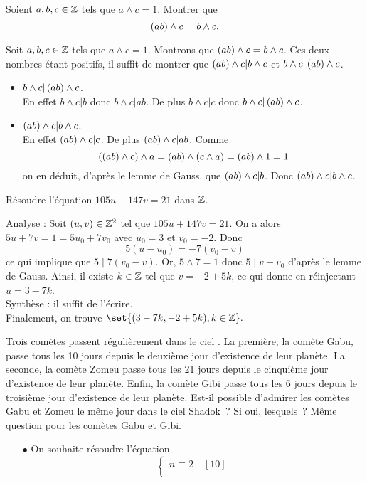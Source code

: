 \documentclass{magnolia}
\begin{document}
\begin{exos}
\exo Soient $a,b,c\in\Z$ tels que $a\wedge c=1$. Montrer que
  \[\left(ab\right)\wedge c=b\wedge c.\]
  \begin{sol}
  Soit $a,b,c\in\Z$ tels que $a\wedge c=1$. Montrons que
  $\p{ab}\wedge c=b\wedge c$. Ces deux nombres étant positifs, il suffit de
  montrer que $\p{ab}\wedge c|b\wedge c$ et $b\wedge c|\p{ab}\wedge c$.
  \begin{itemize}
  \item $b\wedge c|\p{ab}\wedge c$.\\
    En effet $b\wedge c|b$ donc $b\wedge c|ab$. De plus $b\wedge c|c$ donc
    $b\wedge c|\p{ab}\wedge c$.
  \item $\p{ab}\wedge c|b\wedge c$.\\
    En effet $\p{ab}\wedge c|c$. De plus $\p{ab}\wedge c|ab$. Comme
    \[\left(\left(ab\right)\wedge c\right)\wedge a=\left(ab\right)\wedge\left(c\wedge a\right)=\left(ab\right)\wedge 1=1\]
    on en déduit, d'après le lemme de Gauss, que $\p{ab}\wedge c|b$. Donc
    $\p{ab}\wedge c|b\wedge c$.
  \end{itemize}
  \end{sol}
\exo Résoudre l'équation $105u+147v=21$ dans $\Z$.
  \begin{sol}
  Analyse : Soit $(u,v) \in \Z^2$ tel que $105u+147v=21$. On a alors $5u+7v=1=5u_0+7v_0$ avec $u_0=3$ et $v_0=-2$. Donc $$5(u-u_0)=-7(v_0-v)$$ ce qui implique que $5\mid 7(v_0-v)$. Or, $5\wedge 7=1$ donc $5\mid v-v_0$ d'après le lemme de Gauss. Ainsi, il existe $k\in \Z$ tel que $v=-2+5k$, ce qui donne en réinjectant $u=3-7k$.\\
  Synthèse : il suffit de l'écrire.\\
  Finalement, on trouve $\set{(3-7k,-2+5k), k\in\Z}.$
  \end{sol}
\exo Trois comètes passent régulièrement dans le ciel . La
  première, la comète Gabu, passe tous les 10 jours depuis
  le deuxième jour d'existence de leur planète. La seconde, la comète Zomeu
  passe tous les 21 jours depuis le cinquième jour d'existence de leur planète.
  Enfin, la comète Gibi passe tous les 6 jours depuis le troisième jour
  d'existence de leur planète. Est-il possible d'admirer les comètes Gabu et
  Zomeu le même jour dans le ciel Shadok~? Si oui, lesquels~? Même question
  pour les comètes Gabu et Gibi.
  \begin{sol}
  \begin{itemize}
  \item[$\bullet$]
  On souhaite résoudre l'équation 
  $$\begin{cases}n\equiv 2\quad [10]\\

\end{cases}$$
\end{itemize}
\end{sol}
\end{exos}
\end{document}
